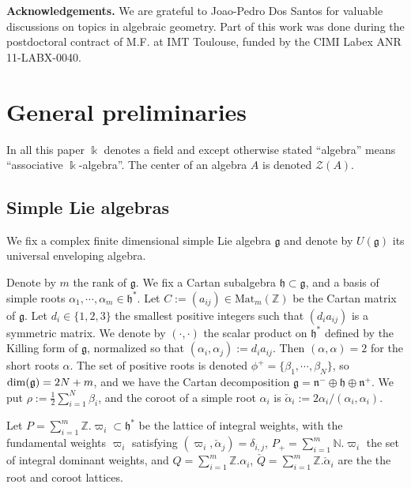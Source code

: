 \documentclass[11pt]{amsart}
\begin{document}
\medskip

\noindent \textbf{Acknowledgements.} We are grateful to Joao-Pedro Dos Santos for valuable discussions on topics in algebraic geometry. Part of this work was done during the postdoctoral contract of M.F. at IMT Toulouse, funded by the CIMI Labex ANR 11-LABX-0040.

\section{General preliminaries} \label{sectionnotations}

In all this paper $\Bbbk$ denotes a field and except otherwise stated ``algebra'' means ``associative $\Bbbk$-algebra''. The center of an algebra $A$ is denoted $\mathcal{Z}(A)$.

\subsection{Simple Lie algebras}\label{subsecLieAlg}
We fix a complex finite dimensional simple Lie algebra $\mathfrak{g}$ and denote by $U(\mathfrak{g})$ its universal enveloping algebra. 

Denote by $m$ the rank of $\mathfrak{g}$. We fix a Cartan subalgebra $\mathfrak{h}\subset \mathfrak{g}$, and a basis of simple roots $\alpha_1,\cdots, \alpha_m\in \mathfrak h^*$. Let $C:=(a_{ij}) \in \mathrm{Mat}_m(\mathbb{Z})$ be the Cartan matrix of $\mathfrak{g}$. Let $d_i\in \{1,2,3\}$ the smallest positive integers such that $(d_ia_{ij})$ is a symmetric matrix. We denote by $(\cdot , \cdot )$ the scalar product on $\mathfrak h^*$ defined by the Killing form of $\mathfrak{g}$, normalized so that $(\alpha_i,\alpha_j) := d_ia_{ij}$. Then $(\alpha,\alpha)=2$ for the short roots $\alpha$. The set of positive roots is denoted $\phi^+=\{\beta_1,\cdots,\beta_N\}$, so ${\rm dim}({\mathfrak{g}})=2N+m$, and we have the Cartan decomposition $\mathfrak{g}=\mathfrak{n}^-\oplus\mathfrak{h}\oplus\mathfrak{n}^+$. We put $\rho:=\textstyle \frac{1}{2}\sum_{i=1}^N\beta_i$, and the coroot of a simple root $\alpha_i$ is $\check{\alpha}_i := 2\alpha_i/(\alpha_i,\alpha_i)$.

Let $P=\textstyle \sum_{i=1}^m \mathbb{Z}. \varpi_i\subset{\mathfrak h}^*$ be the lattice of integral weights, with the fundamental weights $\varpi_i$ satisfying $(\varpi_i,\check{\alpha}_j) = \delta_{i,j}$, $P_+ = \textstyle \sum_{i=1}^m \mathbb{N}. \varpi_i$ the set of integral dominant weights, and $Q = \textstyle \sum_{i=1}^m \mathbb{Z}. \alpha_i$, $\check{Q} = \textstyle \sum_{i=1}^m \mathbb{Z}. \check{\alpha}_i$ are the the root and coroot lattices.
\end{document}
